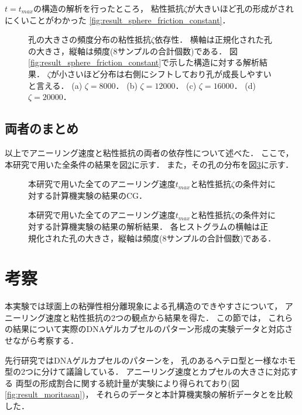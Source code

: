 $t=t_{max}$の構造の解析を行ったところ，
粘性抵抗$\zeta$が大きいほど孔の形成がされにくいことがわかった
\ref{fig:result_sphere_friction_constant}．

\begin{figure}
\centering

\caption{
    孔の大きさの頻度分布の粘性抵抗$\zeta$依存性．
    横軸は正規化された孔の大きさ，縦軸は頻度(8サンプルの合計個数)である．
    図\ref{fig:result_sphere_friction_constant}で示した構造に対する解析結果．
    $\zeta$が小さいほど分布は右側にシフトしており孔が成長しやすいと言える．
    (a) $\zeta=8000$．
    (b) $\zeta=12000$．
    (c) $\zeta=16000$．
    (d) $\zeta=20000$．
}
\label{fig:result_sphere_friction_constant_hist}
\end{figure}

\subsection{両者のまとめ}
以上でアニーリング速度と粘性抵抗の両者の依存性について述べた．
ここで，本研究で用いた全条件の結果を図\ref{fig:result_sphere_all}に示す．
また，その孔の分布を図\ref{fig:result_sphere_all_hist}に示す．

\begin{figure}
\centering

\caption{
    本研究で用いた全てのアニーリング速度$t_{max}$と粘性抵抗$\zeta$の条件対に対する計算機実験の結果のCG．
}
\label{fig:result_sphere_all}
\end{figure}

\begin{figure}
\centering

\caption{
    本研究で用いた全てのアニーリング速度$t_{max}$と粘性抵抗$\zeta$の条件対に対する計算機実験の結果の解析結果．
    各ヒストグラムの横軸は正規化された孔の大きさ，縦軸は頻度(8サンプルの合計個数)である．
}
\label{fig:result_sphere_all_hist}
\end{figure}


\section{考察}

本実験では球面上の粘弾性相分離現象による孔構造のできやすさについて，
アニーリング速度と粘性抵抗の2つの観点から結果を得た．
この節では，
これらの結果について実際のDNAゲルカプセルのパターン形成の実験データと対応させながら考察する．

先行研究ではDNAゲルカプセルのパターンを，
孔のあるヘテロ型と一様なホモ型の2つに分けて議論している．
アニーリング速度とカプセルの大きさに対応する
両型の形成割合に関する統計量が実験により得られており(図\ref{fig:result_moritasan})，
それらのデータと本計算機実験の解析データとを比較した．

